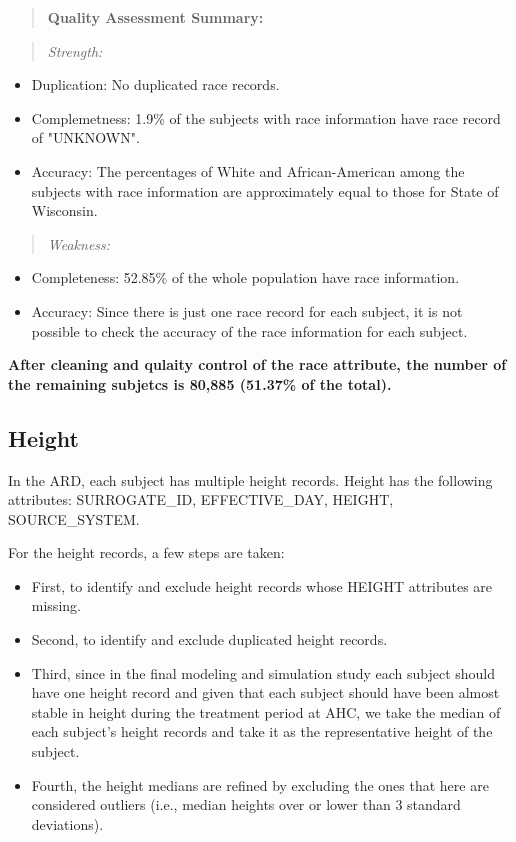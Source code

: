 \documentclass{article}
\begin{document}
\begin{quote}
\textbf{Quality Assessment Summary:}
\end{quote}
\begin{quote}
\emph{Strength:}
\end{quote}
\begin{itemize}
  \item Duplication: No duplicated race records.
  \item Complemetness: 1.9\% of the subjects with race information have race record of "UNKNOWN".
  \item Accuracy: The percentages of White and African-American among the subjects with race information are approximately equal to those for State of Wisconsin.
\end{itemize}
\begin{quote}
\emph{Weakness:}
\end{quote}
\begin{itemize}
  \item Completeness: 52.85\% of the whole population have race information.
  \item Accuracy: Since there is just one race record for each subject, it is not possible to check the accuracy of the race information for each subject.
\end{itemize}

\textbf{After cleaning and qulaity control of the race attribute, the number of the remaining subjetcs is 80,885 (51.37\% of the total).} 


\subsection{Height}
In the ARD, each subject has multiple height records. Height has the following attributes:
SURROGATE\_ID, EFFECTIVE\_DAY, HEIGHT, SOURCE\_SYSTEM.

For the height records, a few steps are taken:
\begin{itemize}
  \item First, to identify and exclude height records whose HEIGHT attributes are missing.
  \item Second, to identify and exclude duplicated height records.
  \item Third, since in the final modeling and simulation study each subject should have one height record and given that each subject should have been almost stable in height during the treatment period at AHC, we take the median of each subject's height records and take it as the representative height of the subject. 
  \item Fourth, the height medians are refined by excluding the ones that here are considered outliers (i.e., median heights over or lower than 3 standard deviations). 
\end{itemize} 
\end{document}
